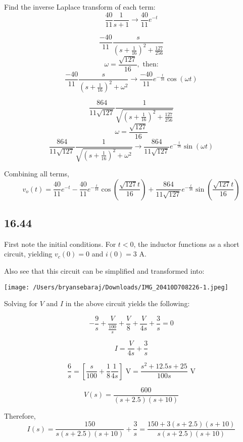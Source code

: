 \documentclass{article}
\begin{document}
Find the inverse Laplace transform of each term:
$$\frac{40}{11}\frac{1}{s+1} \rightarrow \frac{40}{11}e^{-t}$$

$$\frac{-40}{11}\frac{s}{\left(s + \frac{1}{16}\right)^2 + \frac{127}{256}}$$
$$\omega = \frac{\sqrt{127}}{16}, \text{ then:}$$
$$\frac{-40}{11}\frac{s}{\left(s + \frac{1}{16}\right)^2 + \omega^2} \rightarrow \frac{-40}{11}e^{-\frac{t}{16}}\cos(\omega t)$$

$$\frac{864}{11\sqrt{127}}\frac{1}{\sqrt{\left(s + \frac{1}{16}\right)^2 + \frac{127}{256}}}$$
$$\omega = \frac{\sqrt{127}}{16}$$
$$\frac{864}{11\sqrt{127}}\frac{1}{\sqrt{\left(s + \frac{1}{16}\right)^2 + \omega^2}} \rightarrow \frac{864}{11\sqrt{127}}e^{-\frac{t}{16}}\sin(\omega t)$$

Combining all terms,
$$v_o(t) = \frac{40}{11}e^{-t} - \frac{40}{11}e^{-\frac{t}{16}}\cos\left(\frac{\sqrt{127}t}{16}\right) + \frac{864}{11\sqrt{127}}e^{-\frac{t}{16}}\sin\left(\frac{\sqrt{127}t}{16}\right)$$

\subsection*{16.44}

First note the initial conditions. For $t<0$, the inductor functions as a short circuit, yielding $v_c(0)=0$ and $i(0)=3$ A.

\noindent Also see that this circuit can be simplified and transformed into: 

\begin{center}
\texttt{[image: /Users/bryansebaraj/Downloads/IMG\_20410D708226-1.jpeg]}
\end{center}

\noindent Solving for $V$ and $I$ in the above circuit yields the following:

$$-\frac9s + \frac{V}{\frac{100}{s}}+\frac{V}{8} + \frac{V}{4s} + \frac3s = 0$$

    $$I=\frac{V}{4s} + \frac3s$$


$$\frac6s = \left[\frac{s}{100} + \frac18 \frac{1}{4s}\right] \text{ V} = \frac{s^2 + 12.5s + 25}{100 s} \text{ V}$$

$$V(s)=\frac{600}{(s+2.5)(s+10)}$$

\noindent Therefore, $$I(s)=\frac{150}{s(s+2.5)(s+10)} + \frac3s=\frac{150 + 3(s+2.5)(s+10)}{s(s+2.5)(s+10)}$$
\end{document}
